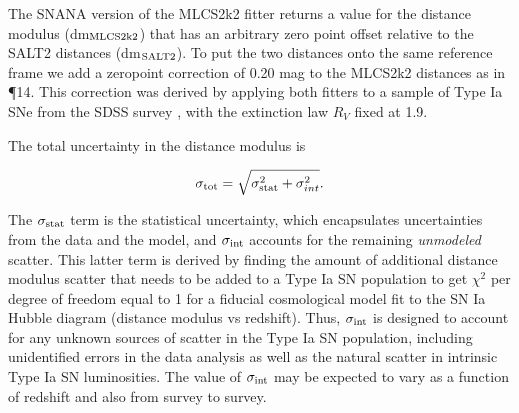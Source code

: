 The SNANA version of the MLCS2k2 fitter returns a value for the
distance modulus (dm$_{\rm MLCS2k2}$) that has an arbitrary zero point
offset relative to the SALT2 distances (dm$_{\rm SALT2}$).  To put the
two distances onto the same reference frame we add a zeropoint
correction of 0.20 mag to the MLCS2k2 distances as
in \P14.  This correction was derived by applying both
fitters to a sample of Type Ia SNe from the SDSS
survey \citep{Holtzman:2008,Kessler:2009b}, with the extinction law
$R_V$ fixed at 1.9.

The total uncertainty in the distance modulus is  

\begin{equation} \label{eqn:sigmatot}
 \sigma_{\rm tot} = \sqrt{ \sigma_{\rm stat}^2 + \sigma_{int}^2}.
\end{equation}

\noindent
The $\sigma_{\rm stat}$ term is the statistical uncertainty, which
encapsulates uncertainties from the data and the model, and
$\sigma_{\rm int}$ accounts for the remaining {\it unmodeled} scatter.
This latter term is derived by finding the amount of additional
distance modulus scatter that needs to be added to a Type Ia SN
population to get $\chi^2$ per degree of freedom equal to 1 for a
fiducial cosmological model fit to the SN Ia Hubble diagram (distance
modulus vs redshift).  Thus, $\sigma_{\rm int}$ is designed to account
for any unknown sources of scatter in the Type Ia SN population,
including unidentified errors in the data analysis as well as the
natural scatter in intrinsic Type Ia SN luminosities.  The value of
$\sigma_{\rm int}$ may be expected to vary as a function of redshift
and also from survey to survey.

